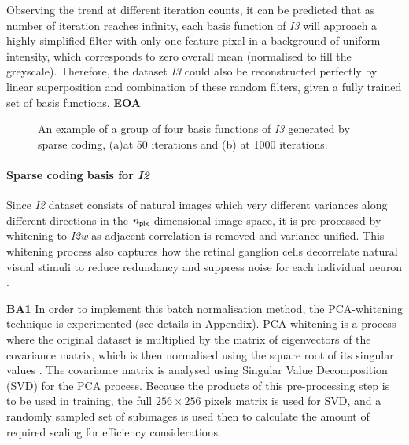 \documentclass[11pt, twocolumn]{article}
\begin{document}
Observing the trend at different iteration counts, it can be predicted that as number of iteration reaches infinity, each basis function of \textit{I3} will approach a highly simplified filter with only one feature pixel in a background of uniform intensity, which corresponds to zero overall mean (normalised to fill the greyscale).
Therefore, the dataset \textit{I3} could also be reconstructed perfectly by linear superposition and combination of these random filters, given a fully trained set of basis functions. \textbf{EOA}

\begin{figure}[ht]
    \centering
    \caption{An example of a group of four basis functions of \textit{I3} generated by sparse coding, (a)at 50 iterations and (b) at 1000 iterations.}
    \label{fig:10}
\end{figure}

\paragraph{Sparse coding basis for \textit{I2}}

Since \textit{I2} dataset consists of natural images which very different variances along different directions in the $n_{\sf pix}$-dimensional image space, it is pre-processed by whitening to \textit{I2w} as adjacent correlation is removed and variance unified. This whitening process also captures how the retinal ganglion cells decorrelate natural visual stimuli to reduce redundancy and suppress noise for each individual neuron \cite{dodds_2019_spatial}.

\textbf{BA1} In order to implement this batch normalisation method, the PCA-whitening technique is experimented (see details in \hyperref[sec:appendix]{Appendix}). PCA-whitening is a process where the original dataset is multiplied by the matrix of eigenvectors of the covariance matrix, which is then normalised using the square root of its singular values \cite{dodds_2019_spatial}. The covariance matrix is analysed using Singular Value Decomposition (SVD) for the PCA process.
Because the products of this pre-processing step is to be used in training, the full $256 \times 256$ pixels matrix is used for SVD, and a randomly sampled set of subimages is used then to calculate the amount of required scaling for efficiency considerations.
\end{document}
